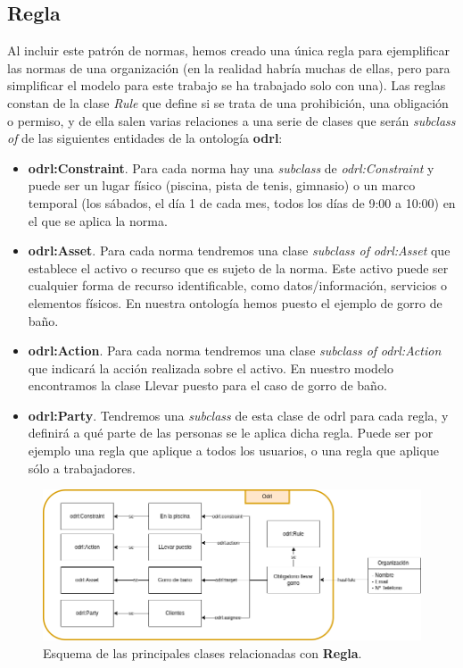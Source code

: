 \documentclass[a4paper,12pt]{article}
\begin{document}
	\subsection{Regla}
	
	Al incluir este patrón de normas, hemos creado una única regla para ejemplificar las normas de
	una organización (en la realidad habría muchas de ellas, pero para simplificar el modelo para este trabajo se ha trabajado solo con una). Las reglas constan de la clase \textit{Rule} que define si se trata de una prohibición, una obligación o permiso, y de ella salen varias relaciones a una serie de clases que serán \textit{subclass of} de las siguientes entidades de la ontología \textbf{odrl}:
	
	\begin{itemize}
		\item \textbf{odrl:Constraint}. Para cada norma hay una \textit{subclass} de \textit{odrl:Constraint} y puede ser un lugar físico (piscina, pista de tenis, gimnasio) o un marco temporal (los sábados, el día 1 de cada mes, todos los días de 9:00 a 10:00) en el que se aplica la norma.
		\item \textbf{odrl:Asset}. Para cada norma tendremos una clase \textit{subclass of} \textit{odrl:Asset} que establece el activo o recurso que es sujeto de la norma. Este activo puede ser cualquier forma de recurso identificable, como datos/información, servicios o elementos físicos. En nuestra ontología hemos puesto el ejemplo de gorro de baño.
		\item \textbf{odrl:Action}. Para cada norma tendremos una clase \textit{subclass of} \textit{odrl:Action} que indicará la acción realizada sobre el activo. En nuestro modelo encontramos la clase Llevar puesto para el caso de gorro de baño.
		\item \textbf{odrl:Party}. Tendremos una \textit{subclass} de esta clase de odrl para cada regla, y definirá a qué parte de las personas se le aplica dicha regla. Puede ser por ejemplo una regla que aplique a todos los usuarios, o una regla que aplique sólo a trabajadores.
	\end{itemize}
	
	\begin{figure}[H]
		\centering
		\includegraphics[width=\textwidth]{include/reglas.png}
		\caption{Esquema de las principales clases relacionadas con \textbf{Regla}.}
	\end{figure}
	
\end{document}
